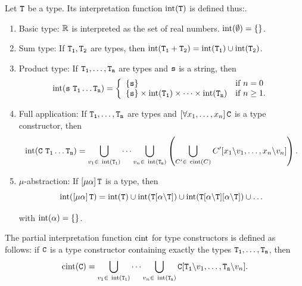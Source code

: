 \begin{definition}\label{def:typeSem}
	Let $\mathtt{T}$ be a type. Its interpretation function $\operatorname{int}(\mathtt{T})$ is defined thus:.
	\begin{enumerate}
		\item {\upshape Basic type:} $\mathbb{R}$ is interpreted as the set of real numbers. $\operatorname{int}(\emptyset) = \{\}$.
		\item {\upshape Sum type:} If $\mathtt{T_1}, \mathtt{T_2}$ are types, then $\operatorname{int}(\mathtt{T_1 + T_2}) = \operatorname{int}(\mathtt{T_1}) \cup \operatorname{int}(\mathtt{T_2})$.
		\item {\upshape Product type:} If $\mathtt{T_1},\dots,\mathtt{T_n}$ are types and $\mathtt{s}$ is a string, then
		$$
		\operatorname{int}(\mathtt{s}\ \mathtt{T_1} \dots \mathtt{T_n}) = \left\{
		\begin{array}{l l}
		\{\mathtt{s}\} & \textnormal{if } n = 0\\
		\{\mathtt{s}\} \times \operatorname{int}(\mathtt{T_1}) \times \dots \times \operatorname{int}(\mathtt{T_n}) & \textnormal{if } n \geq 1.
		\end{array}
		\right.
		$$
		
		\item {\upshape Full application:} If $\mathtt{T_1},\dots,\mathtt{T_n}$ are types and $\left[\forall x_1,\dots,x_n \right] \mathtt{C}$ is a type constructor, then
		$$
		\tint(\type{C}\ \type{T_1} \dots \type{T_n}) = \bigcup\limits_{v_1 \in\ \tint(\type{T_1})} \cdots \bigcup\limits_{v_n \in\ \tint(\type{T_n})} \left( \bigcup\limits_{C' \in\ \cint(C)} C'[x_1\backslash v_1,\dots, x_n\backslash v_n] \right).
		$$
		
		\item {\upshape $\mu$-abstraction:} If $\left[\mu \alpha \right]\mathtt{T}$ is a type, then $$\operatorname{int}(\left[\mu \alpha \right]\mathtt{T}) = \operatorname{int}(\mathtt{T}) \cup \operatorname{int}(\mathtt{T}[\alpha\backslash\mathtt{T}]) \cup \operatorname{int}(\mathtt{T}[\alpha\backslash\mathtt{T}][\alpha\backslash\mathtt{T}]) \cup \dots$$
		
		with $\operatorname{int}(\alpha) = \{\}$.
	\end{enumerate}
\end{definition}

\begin{definition}\label{def:typeConSem}
	The partial interpretation function $\operatorname{cint}$ for type constructors is defined as follows: if $\mathtt{C}$ is a type constructor containing exactly the types $\mathtt{T_1},\dots,\mathtt{T_n}$, then
	$$
	\cint(\type{C}) = \bigcup\limits_{v_1 \in\ \tint(\type{T_1})} \cdots \bigcup\limits_{v_n \in\ \tint(\type{T_n})} \type{C}[\type{T_1}\backslash v_1,\dots,\type{T_n}\backslash v_n].
	$$
\end{definition}

